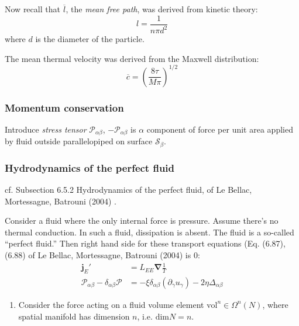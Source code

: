 \documentclass[10pt]{amsart}
\begin{document}
\begin{multicols*}{2}
Now recall that $\overline{l}$, the \emph{mean free path}, was derived from kinetic theory:
\[
l = \frac{1}{n\pi d^2}
\]
where $d$ is the diameter of the particle.  

The mean thermal velocity was derived from the Maxwell distribution:
\[
\overline{c} = \left( \frac{ 8 \tau }{M \pi} \right)^{1/2}
\]








\subsubsection{Momentum conservation}

Introduce \emph{stress tensor} $\mathcal{P}_{\alpha \beta}$, $-\mathcal{P}_{\alpha \beta}$ is $\alpha$ component of force per unit area applied by fluid outside parallelopiped on surface $\mathcal{S}_{\beta}$.  









\subsubsection{Hydrodynamics of the perfect fluid}

cf. Subsection 6.5.2 Hydrodynamics of the perfect fluid, of Le Bellac, Mortessagne, Batrouni (2004) \cite{MLeBellacFMortessagneGBatrouni2004}.  

Consider a fluid where the only internal force is pressure.  Assume there's no thermal conduction.  In such a fluid, dissipation is absent.  The fluid is a so-called ``perfect fluid.''  Then right hand side for these transport equations (Eq. (6.87), (6.88) of Le Bellac, Mortessagne, Batrouni (2004) \cite{MLeBellacFMortessagneGBatrouni2004} is $0$:
\[
\begin{aligned}
  \mathbf{j}_E' & = L_{EE} \mathbf{\nabla} \frac{1}{T} \\  
\mathcal{P}_{\alpha \beta} - \delta_{\alpha \beta} \mathcal{P}  & = -\xi \delta_{\alpha \beta} (\partial_{\gamma} u_{\gamma} ) - 2 \eta \Delta_{\alpha \beta}
\end{aligned}
\]

\begin{enumerate}
  \item Consider the force acting on a fluid volume element $\text{vol}^n \in \Omega^n(N)$, where spatial manifold has dimension $n$, i.e. $\text{dim}N =n$.  


\end{enumerate}
\end{multicols*}
\end{document}
